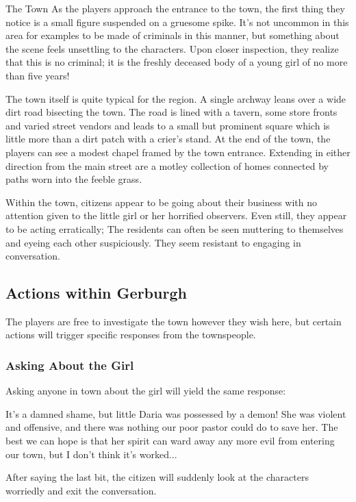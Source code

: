 \documentclass[10pt,twoside,twocolumn]{article}
\begin{document}
\begin{paperbox}{The Town}
    As the players approach the entrance to the town, the first thing they notice is a small figure suspended on a gruesome spike.  It's not uncommon in this area for examples to be made of criminals in this manner, but something about the scene feels unsettling to the characters.  Upon closer inspection, they realize that this is no criminal; it is the freshly deceased body of a young girl of no more than five years!

    The town itself is quite typical for the region.  A single archway leans over a wide dirt road bisecting the town.  The road is lined with a tavern, some store fronts and varied street vendors and leads to a small but prominent square which is little more than a dirt patch with a crier's stand.  At the end of the town, the players can see a modest chapel framed by the town entrance.  Extending in either direction from the main street are a motley collection of homes connected by paths worn into the feeble grass.

    Within the town, citizens appear to be going about their business with no attention given to the little girl or her horrified observers.  Even still, they appear to be acting erratically; The residents can often be seen muttering to themselves and eyeing each other suspiciously.  They seem resistant to engaging in conversation.
\end{paperbox}

\subsection{Actions within Gerburgh}
    The players are free to investigate the town however they wish here, but certain actions will trigger specific responses from the townspeople.

\subsubsection{Asking About the Girl}
Asking anyone in town about the girl will yield the same response:
\begin{quotebox}
    It's a damned shame, but little Daria was possessed by a demon!  She was violent and offensive, and there was nothing our poor pastor could do to save her.  The best we can hope is that her spirit can ward away any more evil from entering our town, but I don't think it's worked...
\end{quotebox}
After saying the last bit, the citizen will suddenly look at the characters worriedly and exit the conversation.
\end{document}
